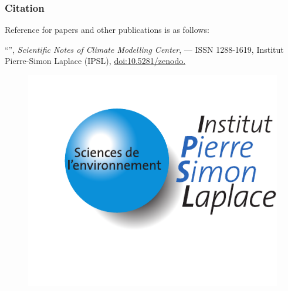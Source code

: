 \subsubsection*{Citation}

Reference for papers and other publications is as follows:

\medskip

\begin{sloppypar}
  ``{\bfseries \heading}\ifdef{\subheading}{ -- \subheading}{}'',
  {\em Scientific Notes of Climate Modelling Center}, \textbf{\ipslnum} --- ISSN 1288-1619,
  Institut Pierre-Simon Laplace (IPSL),
  \href{https://doi.org/10.5281/zenodo.\zid}{doi:10.5281/zenodo.\zid}
\end{sloppypar}

\begin{figure}[b]
  \begin{minipage}[c]{0.7\textwidth}
    \small
  \end{minipage}
  \hfill
  \begin{minipage}[c]{0.25\textwidth}
    \href{http://www.cmc.ipsl.fr}{\includegraphics[width=\textwidth]{logos/IPSL_upright}}
  \end{minipage}
\end{figure}
